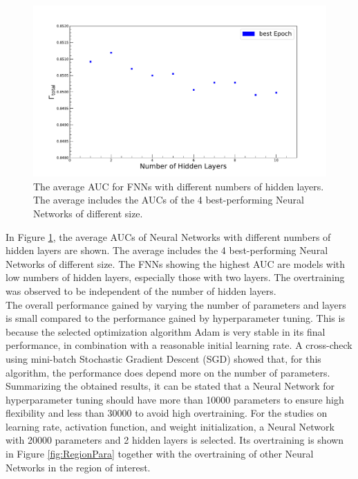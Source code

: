 \begin{figure}[H]
\centering
\includegraphics[width=\linewidth]{figs/FNN/Aver_LayersAuc}
\caption{The average AUC for FNNs with different numbers of hidden layers. The average includes the AUCs of the 4 best-performing Neural Networks of different size.}
\label{fig:AucLayers}
\end{figure}

\newpage

In Figure \ref{fig:AucLayers}, the average AUCs of Neural Networks with different numbers of hidden layers are shown. The average includes the 4 best-performing Neural Networks of different size. The FNNs showing the highest AUC are models with low numbers of hidden layers, especially those with two layers. The overtraining was observed to be independent of the number of hidden layers. \\
The overall performance gained by varying the number of parameters and layers is small compared to the performance gained by hyperparameter tuning. This is because the selected optimization algorithm Adam is very stable in its final performance, in combination with a reasonable initial learning rate. A cross-check using mini-batch Stochastic Gradient Descent (SGD) showed that, for this algorithm, the performance does depend more on the number of parameters. \\
Summarizing the obtained results, it can be stated that a Neural Network for hyperparameter tuning should have more than 10000 parameters to ensure high flexibility and less than 30000 to avoid high overtraining.
For the studies on learning rate, activation function, and weight initialization, a Neural Network with 20000 parameters and 2 hidden layers is selected. Its overtraining is shown in Figure \ref{fig:RegionPara} together with the overtraining of other Neural Networks in the region of interest.


